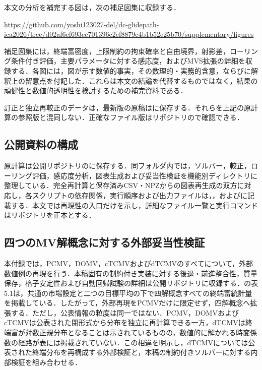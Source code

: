\documentclass[10pt,a4paper]{article}
\theoremstyle{plain}
\theoremstyle{definition}
\begin{document}
本文の分析を補完する図は，次の補足図集に収録する．
\begin{center}
\url{https://github.com/yoshi123027-del/dc-glidepath-ica2026/tree/d02af6cf693ec701396c2ef8879c4b1b52e25b70/supplementary/figures}
\end{center}
補足図集には，終端富密度，上限制約の拘束確率と自由境界，射影差，ローリング条件付き評価，主要パラメータに対する感応度，およびMVS拡張の詳細を収録する．各図には，図が示す数値的事実，その数理的・実務的含意，ならびに解釈上の留意点を付記した．これらは本文の結論を代替するものではなく，結果の頑健性と数値的透明性を検討するための補完資料である．

訂正と独立再較正のデータは，最新版の原稿はに保存する．それらを上記の原計算の参照版と混同しない．正確なファイル版はリポジトリので確認できる．
\subsection{公開資料の構成}
原計算は公開リポジトリのに保存する．同フォルダ内では，ソルバー，較正，ローリング評価，感応度分析，図表生成および妥当性検証を機能別ディレクトリに整理している．完全再計算と保存済みCSV・NPZからの図表再生成の双方に対応し，各スクリプトの依存関係，実行順序および出力ファイルは，，およびに記載する．本文では再現性の入口だけを示し，詳細なファイル一覧と実行コマンドはリポジトリを正本とする．

\subsection{四つのMV解概念に対する外部妥当性検証}
\label{app:four-model-validation}

本付録では，PCMV，DOMV，cTCMVおよびdTCMVのすべてについて，外部数値例の再現を行う．本稿固有の制約付き実装に対する後退・前進整合性，質量保存，格子安定性および自動回帰試験の詳細は公開リポジトリに収録する．\citet{vanStadenDangForsyth2021}の表5.1は，共通の市場設定と二つの目標平均の下で四解概念すべての終端富統計量を掲載している．したがって，外部再現をPCMVだけに限定せず，四解概念へ拡張する．ただし，公表情報の粒度は同一ではない．PCMV，DOMVおよびcTCMVは公表された閉形式から分布を独立に再計算できる一方，dTCMVは終端富が対数正規分布となることは示されているものの，数値的に解かれる時変係数の経路が表には掲載されていない．この相違を明示し，dTCMVについては公表された終端分布を再構成する外部検証と，本稿の制約付きソルバーに対する内部検証を組み合わせる．
\end{document}
